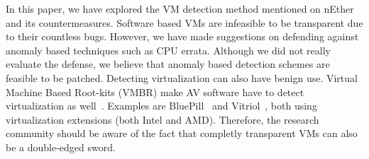 In this paper, we have explored the VM detection method mentioned on nEther\cite{nether} and its countermeasures. Software based VMs are infeasible to be transparent due to their countless bugs. However, we have made suggestions on defending against anomaly based techniques such as CPU errata. Although we did not really evaluate the defense, we believe that anomaly based detection schemes are feasible to be patched.
Detecting virtualization can also have benign use. Virtual Machine Based Root-kits (VMBR) make AV software have to detect virtualization as well~\cite{thompson, ferrie2007}. Examples are BluePill~\cite{bluepill} and Vitriol~\cite{vitriol}, both using virtualization extensions (both Intel and AMD). Therefore, the research community should be aware of the fact that completly transparent VMs can also be a double-edged sword.

